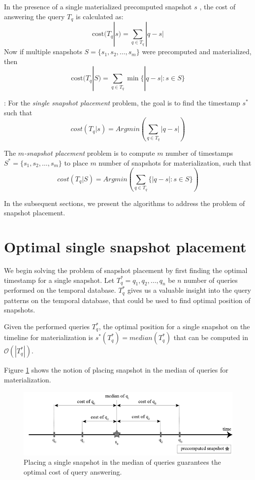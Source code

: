 			\begin{defn} 
				In the presence of a single materialized precomputed snapshot $s$ , the cost of answering the query $T_q$ is calculated as:
				$$\mathrm{cost}(T_q | s) = \sum_{q\in T_q} |q - s|$$
				Now if multiple snapshots $S=\{s_1, s_2, \dots, s_m \}$ were precomputed and materialized, then 
				$$\mathrm{cost}(T_q|S) = \sum_{q\in T_q} \min\{|q-s| : s\in S\}$$
			\label{defn:cost_of_query_answering}
			\end{defn}

			\begin{defn}: 
			    For the \emph{single snapshot placement} problem, the goal is to find the timestamp $s^*$ such that 
				$$cost(T_q|s)= Arg min(\sum_{q\in T_q}|q - s|)$$

				The \emph{$m$-snapshot placement} problem is to compute $m$ number of timestamps $S^*=\{s_1, s_2, \dots, s_m\}$ to place $m$ number of snapshots for materialization, such that 
				$$cost(T_q|S)= Arg min(\sum_{q\in T_q}\{|q - s|:s \in S\})$$
			\label{defn:optimal_snapshot_placement}
			\end{defn}

			In the subsequent sections, we present the algorithms to address the problem of snapshot placement.

	\section{Optimal single snapshot placement} \label{sec:optimal_single_snapshot}
		We begin solving the problem of snapshot placement by first finding the optimal timestamp for a single snapshot. Let $T_q^* = {q_1,q_2, \dots , q_n}$ be $n$ number of queries performed on the temporal database. $T_q^*$ gives us a valuable insight into the query patterns on the temporal database, that could be used to find optimal position of snapshots.

		\begin{prop}
			Given the performed queries $T_q^*$, the optimal position for a single snapshot on the timeline for materialization is $s^*(T_q^*)=median(T_q^*)$ that can be computed in $\mathcal{O}(|T_q^*|)$. 
		\label{prop:compute-median}
		\end{prop}
		    
		Figure \ref{fig:optimal_materialization} shows the notion of placing snapshot in the median of queries for materialization.

		\begin{figure}
			\centering
			\includegraphics[width=\textwidth]{figs/optimal_materialization.pdf}
			\caption{Placing a single snapshot in the median of queries guarantees the optimal cost of query answering.}
			\label{fig:optimal_materialization}
		\end{figure}

